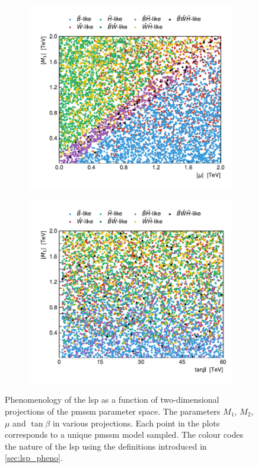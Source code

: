 \begin{figure}[H]
	\vspace{-1.0em}
	\begin{subfigure}[b]{0.47\linewidth}
		\centering\includegraphics[width=\textwidth]{scatter/lsp_types_mu_M1}
	\end{subfigure}\hfill
	\begin{subfigure}[b]{0.47\linewidth}
		\centering\includegraphics[width=\textwidth]{scatter/lsp_types_tanb_M1}
	\end{subfigure}\hfill
	\caption{Phenomenology of the \gls{lsp} as a function of two-dimensional projections of the \gls{pmssm} parameter space. The parameters $M_1$, $M_2$, $\mu$ and $\tan\beta$ in various projections. Each point in the plots corresponds to a unique \gls{pmssm} model sampled. The colour codes the nature of the \gls{lsp} using the definitions introduced in \cref{sec:lsp_pheno}.}
	\label{fig:lsp_phenomenology_parameters}
\end{figure}


